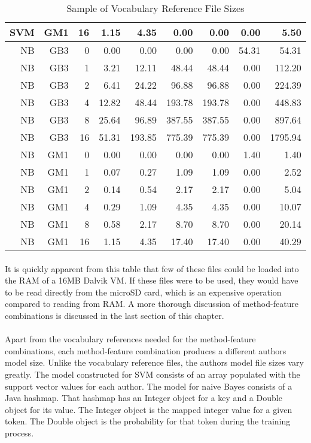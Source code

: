 \begin{table}[htbp!]
\begin{center}
\begin{tabular}{ | r | r | r | r | r | r | r | r | r | }
			SVM & GM1 & 16 & 1.15 & 4.35 & 0.00 & 0.00 & 0.00 & 5.50\\ \hline 
			NB & GB3 & 0 & 0.00 & 0.00 & 0.00 & 0.00 & 54.31 & 54.31\\ \hline 
			NB & GB3 & 1 & 3.21 & 12.11 & 48.44 & 48.44 & 0.00 & 112.20\\ \hline 
			NB & GB3 & 2 & 6.41 & 24.22 & 96.88 & 96.88 & 0.00 & 224.39\\ \hline 
			NB & GB3 & 4 & 12.82 & 48.44 & 193.78 & 193.78 & 0.00 & 448.83\\ \hline 
			NB & GB3 & 8 & 25.64 & 96.89 & 387.55 & 387.55 & 0.00 & 897.64\\ \hline 
			NB & GB3 & 16 & 51.31 & 193.85 & 775.39 & 775.39 & 0.00 & 1795.94\\ \hline 
			NB & GM1 & 0 & 0.00 & 0.00 & 0.00 & 0.00 & 1.40 & 1.40\\ \hline 
			NB & GM1 & 1 & 0.07 & 0.27 & 1.09 & 1.09 & 0.00 & 2.52\\ \hline 
			NB & GM1 & 2 & 0.14 & 0.54 & 2.17 & 2.17 & 0.00 & 5.04\\ \hline 
			NB & GM1 & 4 & 0.29 & 1.09 & 4.35 & 4.35 & 0.00 & 10.07\\ \hline 
			NB & GM1 & 8 & 0.58 & 2.17 & 8.70 & 8.70 & 0.00 & 20.14\\ \hline 
			NB & GM1 & 16 & 1.15 & 4.35 & 17.40 & 17.40 & 0.00 & 40.29\\ \hline
		\end{tabular}
		\caption{Sample of Vocabulary Reference File Sizes}
		\label{tab:sample_vocab_reference_sizes}
		\end{center}
	\end{table}
	

	\paragraph*{} It is quickly apparent from this table that few of these files could be loaded into the RAM of a 16MB Dalvik VM.  If these files were to be used, they would have to be read directly from the microSD card, which is an expensive operation compared to reading from RAM.  A more thorough discussion of method-feature combinations is discussed in the last section of this chapter.
	
	\paragraph*{} Apart from the vocabulary references needed for the method-feature combinations, each method-feature combination produces a different authors model size.  Unlike the vocabulary reference files, the authors model file sizes vary greatly.  The model constructed for SVM consists of an array populated with the support vector values for each author.  The model for naive Bayes consists of a Java hashmap.  That hashmap has an Integer object for a key and a Double object for its value.  The Integer object is the mapped integer value for a given token.  The Double object is the probability for that token during the training process.
	
